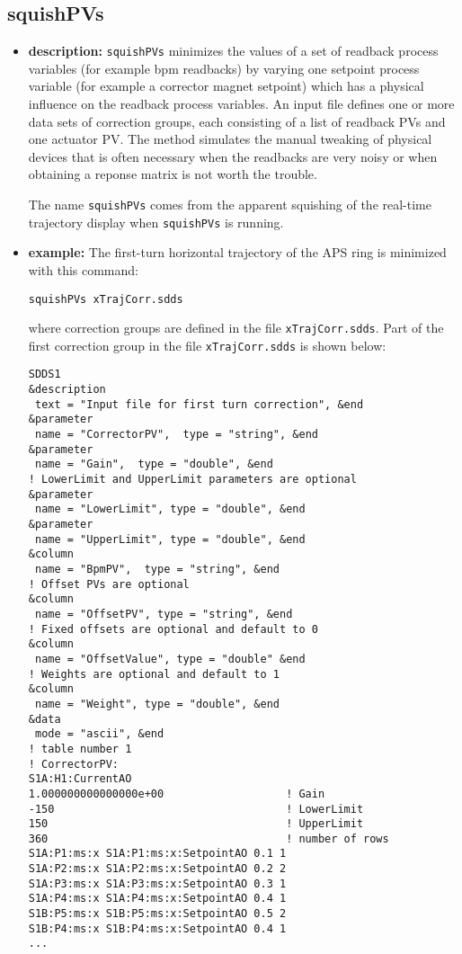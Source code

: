 %
%
\begin{latexonly}
\newpage
\end{latexonly}
%
%
\subsection{squishPVs}
\label{squishPVs}

\begin{itemize}
\item {\bf description:}
%
%
\verb+squishPVs+ minimizes the values of a set of readback process 
variables (for example bpm readbacks) by varying one setpoint process 
variable (for example a corrector magnet setpoint) which has
a physical influence on the readback process variables. 
An input file defines one or more data sets of correction groups, each
consisting of a list of readback PVs and one actuator PV. 
The method simulates the manual tweaking of physical devices that is often necessary
when the readbacks are very noisy or when obtaining a reponse matrix is not
worth the trouble.

The name \verb+squishPVs+ comes from the apparent squishing of the real-time
trajectory display when \verb+squishPVs+ is running.
\item {\bf example:} 
%
% 
%
The first-turn horizontal trajectory of the APS ring is minimized with this command:
\begin{verbatim}
squishPVs xTrajCorr.sdds 
\end{verbatim}
where correction groups are defined in the file \verb+xTrajCorr.sdds+.
Part of the first correction group in the file \verb+xTrajCorr.sdds+
is shown below:
\begin{verbatim}
SDDS1
&description
 text = "Input file for first turn correction", &end
&parameter
 name = "CorrectorPV",  type = "string", &end
&parameter
 name = "Gain",  type = "double", &end
! LowerLimit and UpperLimit parameters are optional
&parameter 
 name = "LowerLimit", type = "double", &end
&parameter 
 name = "UpperLimit", type = "double", &end
&column
 name = "BpmPV",  type = "string", &end
! Offset PVs are optional
&column
 name = "OffsetPV", type = "string", &end
! Fixed offsets are optional and default to 0
&column
 name = "OffsetValue", type = "double" &end
! Weights are optional and default to 1
&column 
 name = "Weight", type = "double", &end
&data
 mode = "ascii", &end
! table number 1
! CorrectorPV: 
S1A:H1:CurrentAO
1.000000000000000e+00                   ! Gain
-150                                    ! LowerLimit
150                                     ! UpperLimit
360                                     ! number of rows
S1A:P1:ms:x S1A:P1:ms:x:SetpointAO 0.1 1
S1A:P2:ms:x S1A:P2:ms:x:SetpointAO 0.2 2
S1A:P3:ms:x S1A:P3:ms:x:SetpointAO 0.3 1
S1A:P4:ms:x S1A:P4:ms:x:SetpointAO 0.4 1
S1B:P5:ms:x S1B:P5:ms:x:SetpointAO 0.5 2
S1B:P4:ms:x S1B:P4:ms:x:SetpointAO 0.4 1
...
\end{verbatim}



\end{itemize}
